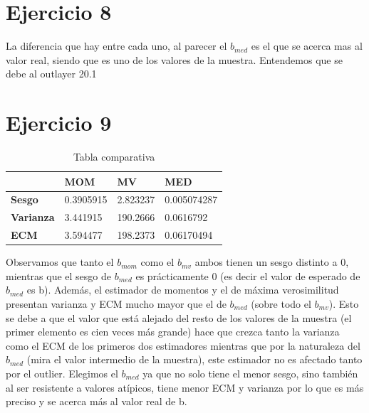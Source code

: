 \documentclass{article}
\begin{document}
\section{Ejercicio 8}
La diferencia que hay entre cada uno, al parecer el $b_{med}$ es el que se acerca mas al valor real, siendo que es uno de los valores de la muestra. Entendemos que se debe al outlayer 20.1

\newpage

\section{Ejercicio 9}
\newline

\begin{table}[h!]
\centering
\caption{Tabla comparativa}
\label{my-label}
\begin{tabular}{llll}
\hline
\multicolumn{1}{|l|}{}                  & \multicolumn{1}{l|}{\textbf{MOM}} & \multicolumn{1}{l|}{\textbf{MV}} & \multicolumn{1}{l|}{\textbf{MED}} \\ \hline
\multicolumn{1}{|l|}{\textbf{Sesgo}}    & \multicolumn{1}{l|}{0.3905915}   & \multicolumn{1}{l|}{2.823237}   & \multicolumn{1}{l|}{0.005074287}    \\ \hline
\multicolumn{1}{|l|}{\textbf{Varianza}} & \multicolumn{1}{l|}{3.441915}     & \multicolumn{1}{l|}{190.2666}    & \multicolumn{1}{l|}{0.0616792}   \\ \hline
\multicolumn{1}{|l|}{\textbf{ECM}}      & \multicolumn{1}{l|}{3.594477}     & \multicolumn{1}{l|}{198.2373}    & \multicolumn{1}{l|}{0.06170494}    \\ \hline

\end{tabular}
\end{table}
Observamos que tanto el $b_{mom}$ como el $b_{mv}$ ambos tienen un sesgo distinto a 0, mientras que el sesgo de $b_{med}$ es prácticamente 0 (es decir el valor de esperado de $b_{med}$ es b). Además, el estimador de momentos y el de máxima verosimilitud presentan varianza y ECM mucho mayor que el de $b_{med}$ (sobre todo el $b_{mv}$). Esto se debe a que el valor que está alejado del resto de los valores de la muestra (el primer elemento es cien veces más grande) hace que crezca tanto la varianza como el ECM de los primeros dos estimadores mientras que por la naturaleza del $b_{med}$ (mira el valor intermedio de la muestra), este estimador no es afectado tanto por el outlier. Elegimos el $b_{med}$ ya que no solo tiene el menor sesgo, sino también al ser resistente a valores atípicos, tiene menor ECM y varianza por lo que es más preciso y se acerca más al valor real de b.
\end{document}
